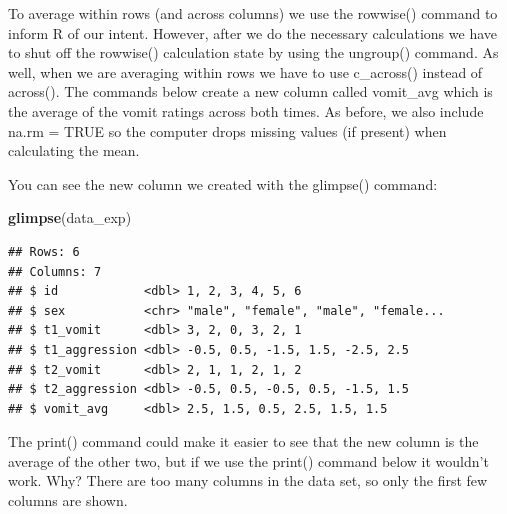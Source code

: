 \documentclass[
]{krantz}
\makeatletter
\newenvironment{Shaded}{\begin{snugshade}}{\end{snugshade}}
\newcommand{\DataTypeTok}[1]{\textcolor[rgb]{0.27,0.27,0.27}{#1}}
\newcommand{\KeywordTok}[1]{\textcolor[rgb]{0.27,0.27,0.27}{\textbf{#1}}}
\newcommand{\NormalTok}[1]{#1}
\newcommand{\OperatorTok}[1]{\textcolor[rgb]{0.43,0.43,0.43}{\textbf{#1}}}
\newcommand{\OtherTok}[1]{\textcolor[rgb]{0.37,0.37,0.37}{#1}}
\newcommand{\StringTok}[1]{\textcolor[rgb]{0.5,0.5,0.5}{#1}}
\newenvironment{kframe}{%
\medskip{}
\setlength{\fboxsep}{.8em}
 \def\at@end@of@kframe{}%
 \ifinner\ifhmode%
  \def\at@end@of@kframe{\end{minipage}}%
  \begin{minipage}{\columnwidth}%
 \fi\fi%
 \def\FrameCommand##1{\hskip\@totalleftmargin \hskip-\fboxsep
 \colorbox{shadecolor}{##1}\hskip-\fboxsep
     \hskip-\linewidth \hskip-\@totalleftmargin \hskip\columnwidth}%
 \MakeFramed {\advance\hsize-\width
   \@totalleftmargin\z@ \linewidth\hsize
   \@setminipage}}%
 {\par\unskip\endMakeFramed%
 \at@end@of@kframe}
\renewenvironment{Shaded}{\begin{kframe}}{\end{kframe}}
\makeatother
\begin{document}
To average within rows (and across columns) we use the rowwise() command to inform R of our intent. However, after we do the necessary calculations we have to shut off the rowwise() calculation state by using the ungroup() command. As well, when we are averaging within rows we have to use c\_across() instead of across(). The commands below create a new column called vomit\_avg which is the average of the vomit ratings across both times. As before, we also include na.rm = TRUE so the computer drops missing values (if present) when calculating the mean.

\begin{Shaded}
\end{Shaded}

You can see the new column we created with the glimpse() command:

\begin{Shaded}
\begin{Highlighting}[]
\KeywordTok{glimpse}\NormalTok{(data_exp)}
\end{Highlighting}
\end{Shaded}

\begin{verbatim}
## Rows: 6
## Columns: 7
## $ id            <dbl> 1, 2, 3, 4, 5, 6
## $ sex           <chr> "male", "female", "male", "female...
## $ t1_vomit      <dbl> 3, 2, 0, 3, 2, 1
## $ t1_aggression <dbl> -0.5, 0.5, -1.5, 1.5, -2.5, 2.5
## $ t2_vomit      <dbl> 2, 1, 1, 2, 1, 2
## $ t2_aggression <dbl> -0.5, 0.5, -0.5, 0.5, -1.5, 1.5
## $ vomit_avg     <dbl> 2.5, 1.5, 0.5, 2.5, 1.5, 1.5
\end{verbatim}

The print() command could make it easier to see that the new column is the average of the other two, but if we use the print() command below it wouldn't work. Why? There are too many columns in the data set, so only the first few columns are shown.
\end{document}
